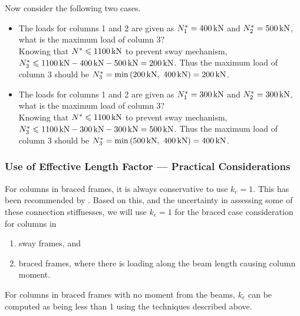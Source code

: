 Now consider the following two cases.
\begin{itemize}
\item The loads for columns 1 and 2 are given as $N^*_1=\SI{400}{\kilo\newton}$ and $N^*_2=\SI{500}{\kilo\newton}$, what is the maximum load of column 3?\\Knowing that $N^*\leqslant\SI{1100}{\kilo\newton}$ to prevent sway mechanism, $N^*_3\leqslant\SI{1100}{\kilo\newton}-\SI{400}{\kilo\newton}-\SI{500}{\kilo\newton}=\SI{200}{\kilo\newton}$.
Thus the maximum load of column 3 should be $N^*_3=\min\left(\SI{200}{\kilo\newton},~\SI{400}{\kilo\newton}\right)=\SI{200}{\kilo\newton}$.
\item The loads for columns 1 and 2 are given as $N^*_1=\SI{300}{\kilo\newton}$ and $N^*_2=\SI{300}{\kilo\newton}$, what is the maximum load of column 3?\\Knowing that $N^*\leqslant\SI{1100}{\kilo\newton}$ to prevent sway mechanism, $N^*_3\leqslant\SI{1100}{\kilo\newton}-\SI{300}{\kilo\newton}-\SI{300}{\kilo\newton}=\SI{500}{\kilo\newton}$.
Thus the maximum load of column 3 should be $N^*_3=\min\left(\SI{500}{\kilo\newton},~\SI{400}{\kilo\newton}\right)=\SI{400}{\kilo\newton}$.
\end{itemize}
\subsubsection{Use of Effective Length Factor --- Practical Considerations}
For columns in braced frames, it is always conservative to use $k_e=1$.
This has been recommended by \citet{Yura1971}.
Based on this, and the uncertainty in assessing some of these connection stiffnesses, we will use $k_e=1$ for the braced case consideration for columns in
\begin{enumerate}
\item sway frames, and
\item braced frames, where there is loading along the beam length causing column moment.
\end{enumerate}
For columns in braced frames with no moment from the beams, $k_e$ can be computed as being less than \num{1} using the techniques described above.

